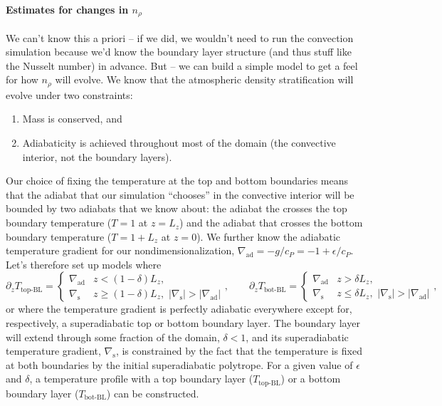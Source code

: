 \documentclass[aps, pre, onecolumn, nofootinbib, notitlepage, groupedaddress, amsfonts, amssymb, amsmath, longbibliography, superscriptaddress]{revtex4-1}
\newcommand{\grad}{\ensuremath{\nabla}}
\begin{document}
\paragraph{Estimates for changes in $n_\rho$}
We can't know this a priori -- if we did, we wouldn't need to run the convection simulation because we'd know the boundary layer structure (and thus stuff like the Nusselt number) in advance.
But -- we can build a simple model to get a feel for how $n_\rho$ will evolve.
We know that the atmospheric density stratification will evolve under two constraints:
\begin{enumerate}
\item Mass is conserved, and
\item Adiabaticity is achieved throughout most of the domain (the convective interior, not the boundary layers).
\end{enumerate}
Our choice of fixing the temperature at the top and bottom boundaries means that the adiabat that our simulation ``chooses'' in the convective interior will be bounded by two adiabats that we know about: the adiabat the crosses the top boundary temperature ($T = 1$ at $z = L_z$) and the adiabat that crosses the bottom boundary temperature ($T = 1 + L_z$ at $z = 0$).
We further know the adiabatic temperature gradient for our nondimensionalization, $\grad_{\text{ad}} = -g / c_P = -1 + \epsilon/c_P$.
Let's therefore set up models where
\begin{equation}
\partial_z T_{\text{top-BL}} = \begin{cases}
\grad_{\text{ad}} & z < (1-\delta) L_z, \\
\grad_{\text{s}}  & z \geq (1-\delta) L_z, \,\, |\grad_{\text{s}}| > |\grad_{\text{ad}}|
\end{cases},\qquad
\partial_z T_{\text{bot-BL}} = \begin{cases}
\grad_{\text{ad}} & z > \delta L_z, \\
\grad_{\text{s}}  & z \leq \delta L_z, \,\, |\grad_{\text{s}}| > |\grad_{\text{ad}}|
\end{cases},
\end{equation}
or where the temperature gradient is perfectly adiabatic everywhere except for, respectively, a superadiabatic top or bottom boundary layer.
The boundary layer will extend through some fraction of the domain, $\delta < 1$, and its superadiabatic temperature gradient, $\grad_\text{s}$, is constrained by the fact that the temperature is fixed at both boundaries by the initial superadiabatic polytrope.
For a given value of $\epsilon$ and $\delta$, a temperature profile with a top boundary layer ($T_{\text{top-BL}}$) or a bottom boundary layer ($T_{\text{bot-BL}}$) can be constructed.
\end{document}
